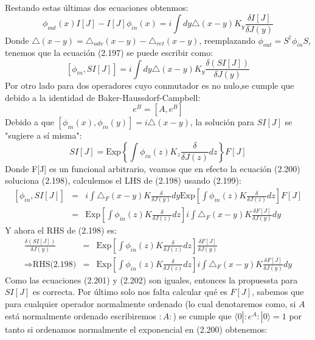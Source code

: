 Restando estas últimas dos ecuaciones obtenmos:
\begin{equation}
\phi_{out}(x)I[J]-I[J]\phi_{in}(x)=i\int dy\triangle(x-y)K_y\frac{\delta I[J]}{\delta J(y)}
\end{equation}
Donde $\triangle(x-y)=\triangle_{adv}(x-y)-\triangle_{ret}(x-y)$, reemplazando $\phi_{out}=S^{\dagger}\phi_{in}S$, tenemos que la ecuación (2.197) se puede escribir como:
\begin{equation}
\left[\phi_{in},SI[J]\right]=i\int dy\triangle(x-y)K_{y}\frac{\delta (SI[J])}{\delta J(y)}
\end{equation}
Por otro lado para dos operadores cuyo conmutador es no nulo,se cumple que debido a la identidad de Baker-Haussdorf-Campbell:
\begin{equation}
[A,B]e^B=[A,e^B]
\end{equation} 
Debido a que $[\phi_{in}(x),\phi_{in}(y)]=i\triangle(x-y)$, la solución para $SI[J]$ se "sugiere a sí misma":
\begin{equation}
SI[J]=\text{Exp}\left\{ \int\phi_{in}(z)K_{z}\frac{\delta}{\delta J(z)}dz\right\} F[J]
\end{equation}
Donde F[J] es un funcional arbitrario, veamos que en efecto la ecuación (2.200) soluciona (2.198), calculemos el LHS de (2.198) usando (2.199):
\begin{eqnarray}
\nonumber \left[\phi_{in},SI[J]\right]&=&i\int\triangle_{F}(x-y)K\frac{\delta}{\delta J(y)}dy\text{Exp}\left[\int\phi_{in}(z)K\frac{\delta}{\delta J(z)}dz\right]F[J]\\
&=&\text{Exp}\left[\int\phi_{in}(z)K\frac{\delta}{\delta J(z)}dz\right]i\int\triangle_{F}(x-y)K\frac{\delta F[J]}{\delta J(y)}dy
\end{eqnarray}
Y ahora el RHS de (2.198) es:
\begin{eqnarray}
\nonumber \frac{\delta(SI[J])}{\delta J(y)}&=&\text{Exp}\left[\int\phi_{in}(z)K\frac{\delta}{\delta J(z)}dz\right]\frac{\delta F[J]}{\delta J(y)}\\
\Rightarrow \text{RHS(2.198)}&=& \text{Exp}\left[\int\phi_{in}(z)K\frac{\delta}{\delta J(z)}dz\right]i\int\triangle_{F}(x-y)K\frac{\delta F[J]}{\delta J(y)}dy
\end{eqnarray}
Como las ecuaciones (2.201) y (2.202) son iguales, entonces la propuessta para $SI[J]$ es correcta. Por último solo nos falta calcular qué es $F[J]$, sabemos que para cualquier operador normalmente ordenado (lo cual denotaremos como, si $A$ está normalmente ordenado escribiremos $:A:$) se cumple que $\langle 0|:e^A:|0\rangle=1$ por tanto si ordenamos normalmente el exponencial en (2.200) obtenemos:
